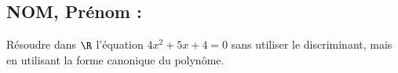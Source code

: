 \documentclass[a4paper,11pt,exos]{nsi}
\begin{document}
\subsection*{NOM, Prénom : \dotfill} 


\maketitle




\begin{exercice}%
    Résoudre dans $\R$ l'équation $4x^2+5x+4=0$ sans utiliser le discriminant, mais en utilisant la forme canonique du polynôme.
    
\end{exercice}

\end{document}
